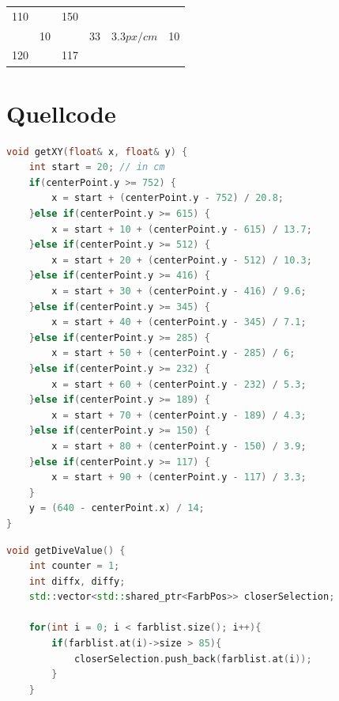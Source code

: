 \begin{appendix}
\begin{table}[h]
\begin{center}
\begin{tabular}[]{| l | l | l | l | l | l |}
                    110     &            & 150   &                &              & \multirow{3}{1cm}{10} \\
                            & 10         &       & 33             & $3.3 px/cm$  & \\
                    \hline
                    120     &            & 117   &                &              & \\
                    \hline

                \end{tabular}
            \end{center}
        \end{table}

    \chapter{Quellcode}

\begin{lstlisting}[language=c++,
                   caption={Funktion: "`getXY''},
                   label={lst:getxy}]
void getXY(float& x, float& y) {
    int start = 20; // in cm
    if(centerPoint.y >= 752) {
        x = start + (centerPoint.y - 752) / 20.8;
    }else if(centerPoint.y >= 615) {
        x = start + 10 + (centerPoint.y - 615) / 13.7;
    }else if(centerPoint.y >= 512) {
        x = start + 20 + (centerPoint.y - 512) / 10.3;
    }else if(centerPoint.y >= 416) {
        x = start + 30 + (centerPoint.y - 416) / 9.6;
    }else if(centerPoint.y >= 345) {
        x = start + 40 + (centerPoint.y - 345) / 7.1;
    }else if(centerPoint.y >= 285) {
        x = start + 50 + (centerPoint.y - 285) / 6;
    }else if(centerPoint.y >= 232) {
        x = start + 60 + (centerPoint.y - 232) / 5.3;
    }else if(centerPoint.y >= 189) {
        x = start + 70 + (centerPoint.y - 189) / 4.3;
    }else if(centerPoint.y >= 150) {
        x = start + 80 + (centerPoint.y - 150) / 3.9;
    }else if(centerPoint.y >= 117) {
        x = start + 90 + (centerPoint.y - 117) / 3.3;
    }
    y = (640 - centerPoint.x) / 14;
}
\end{lstlisting}

\begin{lstlisting}[language=c++,
                   caption={Funktion: "`getDiceValue''},
                   label={lst:getDiveValue1}]
void getDiveValue() {
    int counter = 1;
    int diffx, diffy;
    std::vector<std::shared_ptr<FarbPos>> closerSelection;

    for(int i = 0; i < farblist.size(); i++){
        if(farblist.at(i)->size > 85){
            closerSelection.push_back(farblist.at(i));
        }
    }


\end{lstlisting}
\end{appendix}
